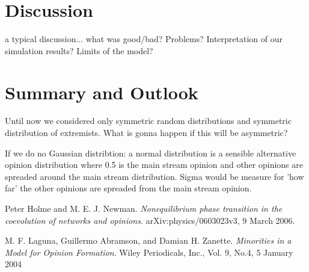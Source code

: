 \documentclass[11pt]{article}
\begin{document}
\section{Discussion}
a typical discussion... what was good/bad? Problems? Interpretation of our simulation results? Limits of the model?

\section{Summary and Outlook}
Until now we considered only symmetric random distributions and symmetric distribution of extremists. What is gonna happen if this will be asymmetric?


If we do no Gaussian distribtion: a normal distribution is a sensible alternative opinion distribution where 0.5 is the main stream opinion and other opinions are spreaded around the main stream distribution. Sigma would be measure for 'how far' the other opinions are spreaded from the main stream opinion.


\begin{thebibliography}{99}
 Peter Holme and M. E. J. Newman. \textit{Nonequilibrium phase transition in the coevolution of networks and opinions}. arXiv:physics/0603023v3, 9 March 2006.

 M. F. Laguna, Guillermo Abramson, and Damian H. Zanette. \textit{Minorities in a Model for Opinion Formation}. Wiley Periodicals, Inc., Vol. 9, No.4, 5 January 2004

\end{thebibliography} 
\end{document}
